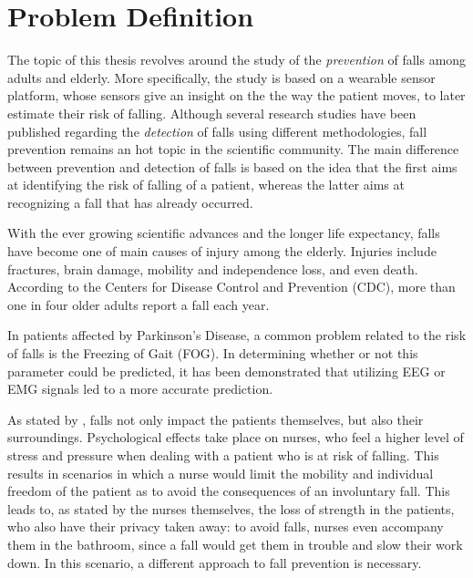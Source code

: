 \section{Problem Definition}
The topic of this thesis revolves around the study of the \textit{prevention} of falls among adults and elderly. More specifically, the study is based on a wearable sensor platform, whose sensors give an insight on the the way the patient moves, to later estimate their risk of falling. 
Although several research studies have been published regarding the \textit{detection} of falls using different methodologies, fall prevention remains an hot topic in the scientific community. The main difference between prevention and detection of falls is based on the idea that the first aims at identifying the risk of falling of a patient, whereas the latter aims at recognizing a fall that has already occurred.

With the ever growing scientific advances and the longer life expectancy, falls have become one of main causes of injury among the elderly. 
Injuries include fractures, brain damage, mobility and independence loss, and even death. According to the Centers for Disease Control and Prevention (CDC), more than one in four older adults report a fall each year. 

In patients affected by Parkinson's Disease, a common problem related to the risk of falls is the Freezing of Gait (FOG). In determining whether or not this parameter could be predicted, it has been demonstrated that utilizing EEG or EMG signals led to a more accurate prediction. 

As stated by \cite{ImpactFallNurses}, falls not only impact the patients themselves, but also their surroundings. Psychological effects take place on nurses, who feel a higher level of stress and pressure when dealing with a patient who is at risk of falling. This results in scenarios in which a nurse would limit the mobility and individual freedom of the patient as to avoid the consequences of an involuntary fall. This leads to, as stated by the nurses themselves, the loss of strength in the patients, who also have their privacy taken away: to avoid falls, nurses even accompany them in the bathroom, since a fall would get them in trouble and slow their work down. 
In this scenario, a different approach to fall prevention is necessary.

